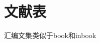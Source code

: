 \documentclass[twoside]{article}
\begin{document}

\section{文献表}

汇编文集类似于book和inbook\cite{韩吉人1985-90-99}\cite{中国职工教育研究会1985--}

{
\printbibliography%
}
\end{document}
